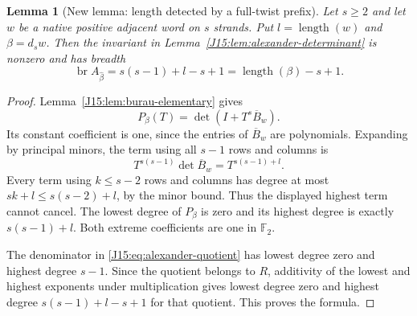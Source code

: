 \documentclass[11pt,oneside]{report}
\newtheorem{lemma}[theorem]{Lemma}
\theoremstyle{definition}
\numberwithin{equation}{section}
\newcommand{\length}{\operatorname{length}}
\begin{document}
\begin{lemma}[New lemma: length detected by a full-twist prefix]
\label{J15:lem:fulltwist-breadth}
Let $s\geq2$ and let $w$ be a native positive adjacent word on
$s$ strands. Put $l=\length(w)$ and $\beta=d_sw$.
Then the invariant in Lemma~\ref{J15:lem:alexander-determinant} is
nonzero and has breadth
\begin{equation}\label{J15:eq:fulltwist-breadth}
 \operatorname{br}A_{\widehat\beta}
    =s(s-1)+l-s+1=\length(\beta)-s+1.
\end{equation}
\end{lemma}
\begin{proof}
Lemma~\ref{J15:lem:burau-elementary} gives
\[
 P_\beta(T)=\det(I+T^s\overline B_w).
\]
Its constant coefficient is one, since the entries of
$\overline B_w$ are polynomials. Expanding by principal minors,
the term using all $s-1$ rows and columns is
\[
 T^{s(s-1)}\det\overline B_w=T^{s(s-1)+l}.
\]
Every term using $k\leq s-2$ rows and columns has degree at most
$sk+l\leq s(s-2)+l$, by the minor bound.
Thus the displayed highest term cannot cancel.
The lowest degree of $P_\beta$ is zero and its highest degree is
exactly $s(s-1)+l$. Both extreme coefficients are one in
$\mathbb F_2$.

The denominator in \eqref{J15:eq:alexander-quotient} has lowest degree
zero and highest degree $s-1$. Since the quotient belongs to $R$,
additivity of the lowest and highest exponents under multiplication
gives lowest degree zero and highest degree
$s(s-1)+l-s+1$ for that quotient. This proves the formula.
\end{proof}
\end{document}
